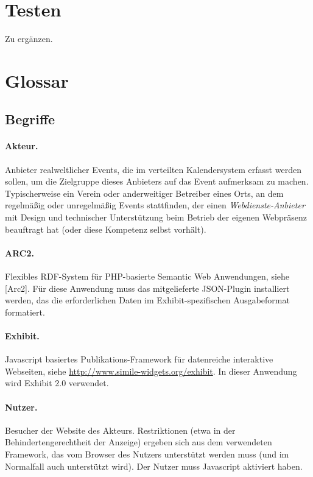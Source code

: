 \documentclass[11pt,a4paper]{article}
\begin{document}
\section{Testen}

Zu ergänzen.

\section{Glossar}

\subsection{Begriffe}

\paragraph{Akteur.} 
Anbieter realweltlicher Events, die im verteilten Kalendersystem erfasst
werden sollen, um die Zielgruppe dieses Anbieters auf das Event aufmerksam zu
machen.  Typischerweise ein Verein oder anderweitiger Betreiber eines Orts, an
dem regelmäßig oder unregelmäßig Events stattfinden, der einen
\emph{Webdienste-Anbieter} mit Design und technischer Unterstüt\-zung beim
Betrieb der eigenen Webpräsenz beauftragt hat (oder diese Kompetenz selbst
vorhält).

\paragraph{ARC2.} 
Flexibles RDF-System für PHP-basierte Semantic Web Anwendungen, siehe [Arc2].
Für diese Anwendung muss das mitgelieferte JSON-Plugin installiert werden, das
die erforderlichen Daten im Exhibit-spezifischen Ausgabeformat formatiert. 

\paragraph{Exhibit.} 
Javascript basiertes Publikations-Framework für datenreiche interaktive
Webseiten, siehe \url{http://www.simile-widgets.org/exhibit}.  In dieser
Anwendung wird Exhibit 2.0 verwendet.

\paragraph{Nutzer.} 
Besucher der Website des Akteurs. Restriktionen (etwa in der
Behindertengerechtheit der Anzeige) ergeben sich aus dem verwendeten
Framework, das vom Browser des Nutzers unterstützt werden muss (und im
Normalfall auch unterstützt wird). Der Nutzer muss Javascript aktiviert haben.
\end{document}
